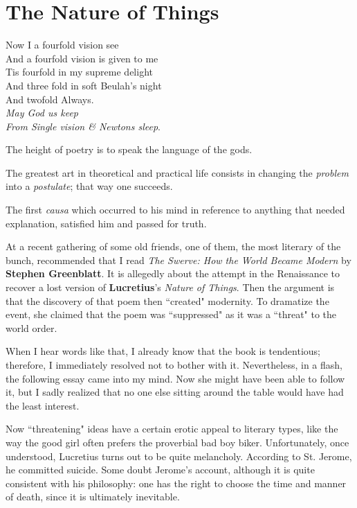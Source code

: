\section{The Nature of Things}

\begin{quotex}
Now I a fourfold vision see\\
And a fourfold vision is given to me\\
Tis fourfold in my supreme delight\\
And three fold in soft Beulah's night\\
And twofold Always.\\
\emph{May God us keep}\\
\emph{From Single vision \& Newtons sleep}. 

The height of poetry is to speak the language of the gods. 

The greatest art in theoretical and practical life consists in changing the \emph{problem} into a \emph{postulate}; that way one succeeds. 

The first \emph{causa} which occurred to his mind in reference to anything that needed explanation, satisfied him and passed for truth. 

\end{quotex}
At a recent gathering of some old friends, one of them, the most literary of the bunch, recommended that I read \emph{The Swerve: How the World Became Modern} by \textbf{Stephen Greenblatt}. It is allegedly about the attempt in the Renaissance to recover a lost version of \textbf{Lucretius}'s \emph{Nature of Things}. Then the argument is that the discovery of that poem then ``created" modernity. To dramatize the event, she claimed that the poem was ``suppressed" as it was a ``threat" to the world order.

When I hear words like that, I already know that the book is tendentious; therefore, I immediately resolved not to bother with it. Nevertheless, in a flash, the following essay came into my mind. Now she might have been able to follow it, but I sadly realized that no one else sitting around the table would have had the least interest.

Now ``threatening" ideas have a certain erotic appeal to literary types, like the way the good girl often prefers the proverbial bad boy biker. Unfortunately, once understood, Lucretius turns out to be quite melancholy. According to St. Jerome, he committed suicide. Some doubt Jerome's account, although it is quite consistent with his philosophy: one has the right to choose the time and manner of death, since it is ultimately inevitable.

